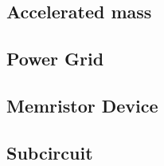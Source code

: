 \clearpage
\subsection{Accelerated mass}


\clearpage
\subsection{Power Grid}


%

\clearpage
\subsection{Memristor Device}




\clearpage
\subsection{Subcircuit}
\label{SubcircuitInstance}




